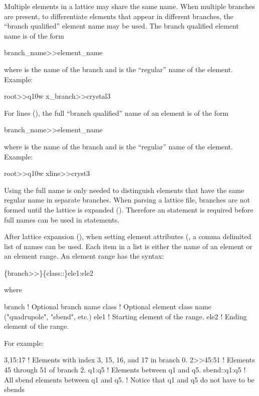 {{{{{Multiple elements in a lattice may share the same name.  When multiple branches are present, to
differentiate elements that appear in different branches, the ``branch qualified'' element name may
be used. The branch qualified element name is of the form
\begin{example}
  branch_name>>element_name
\end{example}
where  is the name of the branch and  is the ``regular'' name of
the element. Example:
\begin{example}
  root>>q10w
  x_branch>>crystal3
\end{example}

For  lines (), the full ``branch qualified'' name of an element is of
the form
\begin{example}
  branch_name>>element_name
\end{example}
where  is the name of the branch and  is the ``regular'' name of
the element. Example:
\begin{example}
  root>>q10w
  xline>>cryst3
\end{example}
Using the full name is only needed to distinguish elements that have the same regular name in
separate branches. When parsing a lattice file, branches are not formed until the lattice is
expanded (). Therefore an  statement is required before full names
can be used in statements.

After lattice expansion (), when setting element attributes (, a
comma delimited list of names can be used. Each item in a list is either the name of an element or
an element range. An element range has the syntax:
\begin{example}
  \{branch>>\}\{class::\}ele1:ele2
\end{example}
where
\begin{example}
  branch   ! Optional branch name
  class    ! Optional element class name ("quadrupole", "sbend", etc.)
  ele1     ! Starting element of the range.
  ele2     ! Ending element of the range. 
\end{example}
For example:
\begin{example}
  3,15:17          ! Elements with index 3, 15, 16, and 17 in branch 0.
  2>>45:51         ! Elements 45 through 51 of branch 2.
  q1:q5            ! Elements between q1 and q5.
  sbend::q1:q5     ! All sbend elements between q1 and q5. 
                   ! Notice that q1 and q5 do not have to be sbends
\end{example}

}}}}}
